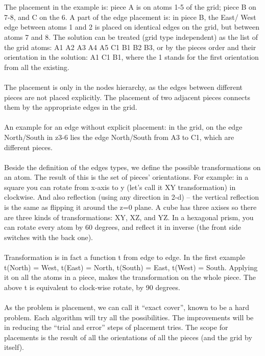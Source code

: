 \documentclass[a4paper,twoside,10pt]{report}
\begin{document}
\\
\\
The placement in the example is: piece A is on atoms 1-5 of the grid; piece B on 7-8, and C on the 6.  A part of the edge placement is: in piece B, the East/ West edge between atoms 1 and 2 is placed on identical edges on the grid, but between atoms 7 and 8. The solution can be treated (grid type independent) as the list of the grid atoms: A1 A2 A3 A4 A5 C1 B1 B2 B3, or by the pieces order and their orientation in the solution: A1 C1 B1, where the 1 stands for the first orientation from all the existing.
\\
\\
The placement is only in the nodes hierarchy, as the edges between different pieces are not placed explicitly. The placement of two adjacent pieces connects them by the appropriate edges in the grid.
\\
\\
An example for an edge without explicit placement: in the grid, on the edge North/South in z3-6 lies the edge North/South from A3 to C1, which are different pieces.
\\
\\
Beside the definition of the edges types, we define the possible transformations on an atom. The result of this is the set of pieces’ orientations. For example: in a square you can rotate from x-axis to y (let’s call it XY transformation) in clockwise. And also reflection (using any direction in 2-d) – the vertical reflection is the same as flipping it around the z=0 plane. A cube has three axises so there are three kinds of transformations: XY, XZ, and YZ. In a hexagonal prism, you can rotate every atom by 60 degrees, and reflect it in inverse (the front side switches with the back one).
\\
\\
Transformation is in fact a function t from edge to edge. In the first example t(North) = West, t(East) = North, t(South) = East, t(West) = South. Applying it on all the atoms in a piece, makes the transformation on the whole piece. The above t is equivalent to clock-wise rotate, by 90 degrees.
\\
\\
As the problem is placement, we can call it “exact cover”, known to be a hard problem. Each algorithm will try all the possibilities. The improvements will be in reducing the “trial and error” steps of placement tries. The scope for placements is the result of all the orientations of all the pieces (and the grid by itself).
\end{document}
